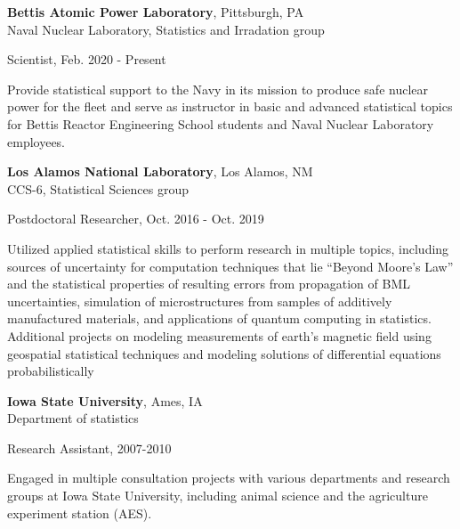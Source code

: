 \documentclass[11pt]{article}
\newenvironment{outerlist}[1][\enskip\textbullet]%
        {\begin{itemize}[#1]}{\end{itemize}%
         \vspace{-.6\baselineskip}}
\newenvironment{innerlist}[1][\enskip\textbullet]%
        {\begin{compactitem}[#1]}{\end{compactitem}}
\begin{document}
\textbf{Bettis Atomic Power Laboratory}, Pittsburgh, PA\\
Naval Nuclear Laboratory, Statistics and Irradation group 
	\begin{outerlist}
		 \item[] Scientist, Feb. 2020 - Present
		 \begin{innerlist}
		\item Provide statistical support to the Navy in its mission to produce safe nuclear power for the fleet and serve as instructor in basic and advanced statistical topics for Bettis Reactor Engineering School students and Naval Nuclear Laboratory employees.
		\end{innerlist}
	\end{outerlist}
\clearpage
\textbf{Los Alamos National Laboratory}, Los Alamos, NM\\
CCS-6, Statistical Sciences group 
	\begin{outerlist}
		 \item[] Postdoctoral Researcher, Oct. 2016 - Oct. 2019
		 \begin{innerlist}
		\item Utilized applied statistical skills to perform research in multiple topics, including sources of uncertainty for computation techniques that lie ``Beyond Moore’s Law'' and the statistical properties of resulting errors from propagation of BML uncertainties, simulation of microstructures from samples of additively manufactured materials, and applications of quantum computing in statistics. Additional projects on modeling measurements of earth's magnetic field using geospatial statistical techniques and modeling solutions of differential equations probabilistically
		\end{innerlist}
	\end{outerlist}
\vspace{0.1in}
\textbf{Iowa State University}, Ames, IA\\
Department of statistics 
	\begin{outerlist}
		 \item[] Research Assistant, 2007-2010
		 \begin{innerlist}
			\item Engaged in multiple consultation projects with various departments and research groups at Iowa State University, including animal science and the agriculture experiment station (AES).
		\end{innerlist}
	\end{outerlist}
\end{document}

